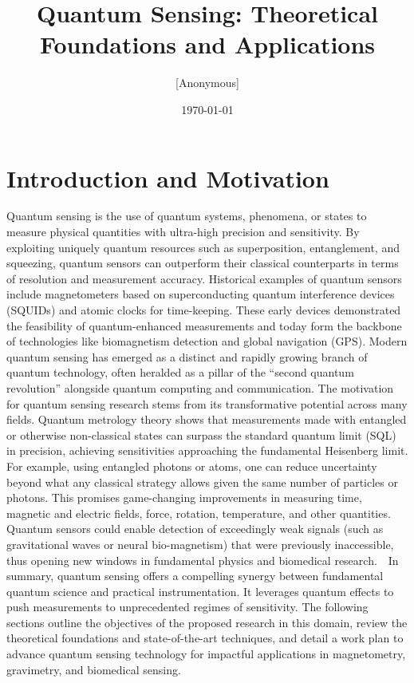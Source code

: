 \documentclass[12pt]{article}
\begin{document}
\title{Quantum Sensing: Theoretical Foundations and Applications}

\author{[Anonymous]}%

\date{\today}

\maketitle

\section{Introduction and Motivation}

Quantum sensing is the use of quantum systems, phenomena, or states to
measure physical quantities with ultra-high precision and
sensitivity. By exploiting uniquely quantum resources such as
superposition, entanglement, and squeezing, quantum sensors can
outperform their classical counterparts in terms of resolution and
measurement accuracy\cite{Degen2017,Giovannetti2011}. Historical
examples of quantum sensors include magnetometers based on
superconducting quantum interference devices (SQUIDs) and atomic
clocks for time-keeping\cite{Degen2017}. These early devices
demonstrated the feasibility of quantum-enhanced measurements and
today form the backbone of technologies like biomagnetism detection
and global navigation (GPS). Modern quantum sensing has emerged as a
distinct and rapidly growing branch of quantum technology, often
heralded as a pillar of the “second quantum revolution” alongside
quantum computing and communication.
The motivation for quantum
sensing research stems from its transformative potential across many
fields. Quantum metrology theory shows that measurements made with
entangled or otherwise non-classical states can surpass the standard
quantum limit (SQL) in precision, achieving sensitivities approaching
the fundamental Heisenberg limit\cite{Giovannetti2011}. For example,
using entangled photons or atoms, one can reduce uncertainty beyond
what any classical strategy allows given the same number of particles
or photons. This promises game-changing improvements in measuring
time, magnetic and electric fields, force, rotation, temperature, and
other quantities. Quantum sensors could enable detection of
exceedingly weak signals (such as gravitational waves or neural
bio-magnetism) that were previously inaccessible, thus opening new
windows in fundamental physics and biomedical research.    In summary,
quantum sensing offers a compelling synergy between fundamental
quantum science and practical instrumentation. It leverages quantum
effects to push measurements to unprecedented regimes of
sensitivity. The following sections outline the objectives of the
proposed research in this domain, review the theoretical foundations
and state-of-the-art techniques, and detail a work plan to advance
quantum sensing technology for impactful applications in magnetometry,
gravimetry, and biomedical sensing.   
\end{document}
